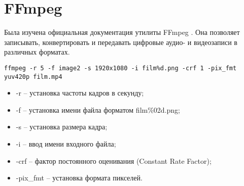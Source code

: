 \section{FFmpeg}
Была изучена официальная документация утилиты FFmpeg \cite{bib7}. Она позволяет записывать, конвертировать и передавать цифровые аудио- и видеозаписи в различных форматах.
	\begin{lstlisting}[caption={Пример создания MP4 видеофильма из PNG изображений}]
ffmpeg -r 5 -f image2 -s 1920x1080 -i film%d.png -crf 1 -pix_fmt yuv420p film.mp4
	\end{lstlisting}
	\begin{itemize}
	\item -r – установка частоты кадров в секунду;
	\item -f – установка имени файла форматом film\%02d.png;
\	\item -s – установка размера кадра;
	\item -i – ввод имени входного файла;
	\item -crf – фактор постоянного оценивания (Constant Rate Factor);
	\item -pix\_fmt – установка формата пикселей.
	\end{itemize}